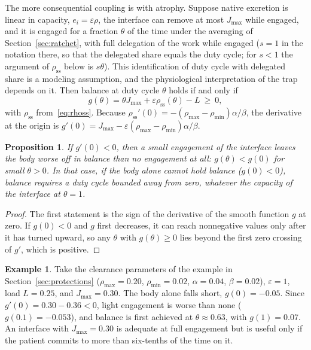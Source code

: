 \documentclass[11pt]{article}
\theoremstyle{plain}
\newtheorem{proposition}{Proposition}
\theoremstyle{definition}
\newtheorem{example}{Example}
\theoremstyle{remark}
\begin{document}
The more consequential coupling is with atrophy. Suppose native excretion is linear in capacity, $e_i=\varepsilon\rho$, the interface can remove at most $J_{\max}$ while engaged, and it is engaged for a fraction $\theta$ of the time under the averaging of Section~\ref{sec:ratchet}, with full delegation of the work while engaged ($s=1$ in the notation there, so that the delegated share equals the duty cycle; for $s<1$ the argument of $\rho_{\mathrm{ss}}$ below is $s\theta$). This identification of duty cycle with delegated share is a modeling assumption, and the physiological interpretation of the trap depends on it. Then balance at duty cycle $\theta$ holds if and only if
\begin{equation}\label{eq:trap}
g(\theta)=\theta J_{\max}+\varepsilon\rho_{\mathrm{ss}}(\theta)-L\ \ge\ 0,
\end{equation}
with $\rho_{\mathrm{ss}}$ from~\eqref{eq:rhoss}. Because $\rho_{\mathrm{ss}}'(0)=-(\rho_{\max}-\rho_{\min})\alpha/\beta$, the derivative at the origin is $g'(0)=J_{\max}-\varepsilon(\rho_{\max}-\rho_{\min})\alpha/\beta$.

\begin{proposition}\label{prop:trap}
If $g'(0)<0$, then a small engagement of the interface leaves the body worse off in balance than no engagement at all: $g(\theta)<g(0)$ for small $\theta>0$. In that case, if the body alone cannot hold balance ($g(0)<0$), balance requires a duty cycle bounded away from zero, whatever the capacity of the interface at $\theta=1$.
\end{proposition}

\begin{proof}
The first statement is the sign of the derivative of the smooth function $g$ at zero. If $g(0)<0$ and $g$ first decreases, it can reach nonnegative values only after it has turned upward, so any $\theta$ with $g(\theta)\ge0$ lies beyond the first zero crossing of $g'$, which is positive.
\end{proof}

\begin{example}
Take the clearance parameters of the example in Section~\ref{sec:protections} ($\rho_{\max}=0.20$, $\rho_{\min}=0.02$, $\alpha=0.04$, $\beta=0.02$), $\varepsilon=1$, load $L=0.25$, and $J_{\max}=0.30$. The body alone falls short, $g(0)=-0.05$. Since $g'(0)=0.30-0.36<0$, light engagement is worse than none ($g(0.1)=-0.053$), and balance is first achieved at $\theta\approx0.63$, with $g(1)=0.07$. An interface with $J_{\max}=0.30$ is adequate at full engagement but is useful only if the patient commits to more than six-tenths of the time on it.
\end{example}
\end{document}
